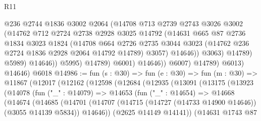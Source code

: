 \begin{lexlean}{R11}
\begin{coremodule}
                              @236
                              @2744
                              @1836
                              @3002
                              @2064
                              (@14708
                                @713
                                @2739
                                @2743
                                @3026
                                @3002
                                (@14762
                                  @712
                                  @2724
                                  @2738
                                  @2928
                                  @3025
                                  @14792
                                  (@14631
                                    @665
                                    @87
                                    @2736
                                    @1834
                                    @3023
                                    @1824
                                    (@14708
                                      @664
                                      @2726
                                      @2735
                                      @3044
                                      @3023
                                      (@14762 @236 @2724 @1836 @2928 @2064 @14792 @14789)
                                      @3057)
                                    @14646))
                                @3063)
                              @14789)
                            @5989)
                          @14646))
                      @5995)
                    @14789)
                  @6001)
                @14646))
            @6007)
          @14789)
        @6013)
      @14646)
    @6018
@14986 := fun (s : @30) =>
  fun (e : @30) =>
  fun (m : @30) =>
  @11867
    (@12017
      (@12162
        (@12598
          (@12684
            (@12935
              (@13091
                (@13175
                  (@13923
                    (@14078
                      (fun ("_" : @14079) =>
                      @14653
                        (fun ("_" : @14654) =>
                        @14668
                          (@14674
                            (@14685
                              (@14701
                                (@14707
                                  (@14715 (@14727 (@14733 @14900 @14646)) (@3055 @14139 @5834))
                                  @14646))
                              (@2625 @14149 @14141))
                            (@14631
                              @1743
                              @87

\end{coremodule}
\end{lexlean}
